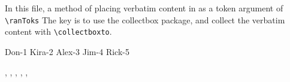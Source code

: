 \documentclass{article}
\begin{document}
In this file, a method of placing verbatim content in as a token argument of
\verb~\ranToks~ The key is to use the \textsf{collectbox} package, and collect
the verbatim content with \verb~\collectboxto~.

\def\cbCont{\def\myVerb{\usebox{\rtcollectbox}}}
\collectboxto{\rtcollectbox}{\cbCont}{\verb!$x^2+1$!}

{}
{%
    {Don-1}
    {Kira-2}
    {Alex-3}
    {Jim-4}
    {Rick-5}
    {}
}

, , , , ,
\end{document}
